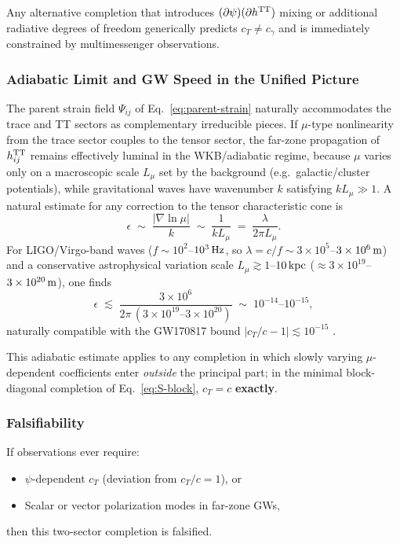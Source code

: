 Any alternative completion that introduces $(\partial\psi)(\partial h^{\rm TT})$ mixing or additional radiative degrees of freedom generically predicts $c_T \neq c_\gamma$ and is immediately constrained by multimessenger observations.

\subsubsection{Adiabatic Limit and GW Speed in the Unified Picture}

The parent strain field $\Psi_{ij}$ of Eq.~\eqref{eq:parent-strain} naturally accommodates the trace and TT sectors as complementary irreducible pieces.  If $\mu$-type nonlinearity from the trace sector couples to the tensor sector, the far-zone
propagation of $h_{ij}^{\rm TT}$ remains effectively luminal in the WKB/adiabatic
regime, because $\mu$ varies only on a macroscopic scale $L_\mu$ set by the
background (e.g.\ galactic/cluster potentials), while gravitational waves have
wavenumber $k$ satisfying $kL_\mu\gg 1$.
A natural estimate for any correction to the tensor characteristic cone is
\begin{equation}\label{eq:wkb-suppression}
\epsilon \;\sim\; \frac{|\nabla \ln \mu|}{k} \;\sim\; \frac{1}{kL_\mu}
\;=\;\frac{\lambda}{2\pi L_\mu}.
\end{equation}
For LIGO/Virgo-band waves ($f\sim 10^2$--$10^3\,{\rm Hz}$, so
$\lambda=c/f\sim 3\times 10^5$--$3\times 10^6\,{\rm m}$) and a conservative
astrophysical variation scale $L_\mu\gtrsim 1$--$10\,{\rm kpc}$ 
($\approx 3\times 10^{19}$--$3\times 10^{20}\,{\rm m}$), one finds
\begin{equation}
\epsilon \;\lesssim\; \frac{3\times 10^6}{2\pi\,(3\times 10^{19}\text{--}3\times 10^{20})}
\;\sim\;10^{-14}\text{--}10^{-15},
\end{equation}
naturally compatible with the GW170817 bound $|c_T/c-1|\lesssim 10^{-15}$ \cite{Abbott2017GW}.

This adiabatic estimate applies to any completion in which slowly varying $\mu$-dependent coefficients enter \textit{outside} the principal part; in the minimal block-diagonal completion of Eq.~\eqref{eq:S-block}, $c_T = c$ \textbf{exactly}.

\subsubsection{Falsifiability}

If observations ever require:
\begin{itemize}
\item $\psi$-dependent $c_T$ (deviation from $c_T/c = 1$), or
\item Scalar or vector polarization modes in far-zone GWs,
\end{itemize}
then this two-sector completion is falsified.

